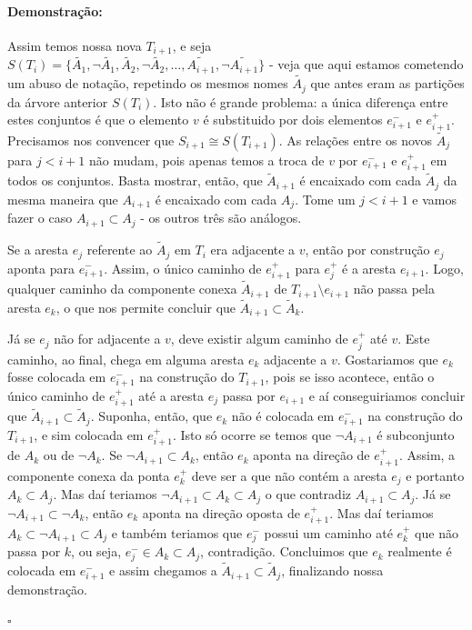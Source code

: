 \documentclass[11pt]{article}
\newcommand{\pulinho}{\vspace{.5cm}}
\theoremstyle{definition}
\theoremstyle{definition}
\theoremstyle{definition}
\theoremstyle{definition}
\theoremstyle{definition}
\theoremstyle{definition}
\theoremstyle{definition}
\theoremstyle{definition}
\theoremstyle{definition}
\theoremstyle{definition}
\theoremstyle{definition}
\theoremstyle{definition}
\newenvironment{prova}{\paragraph{Demonstração:}}{\hfill$\square$ 
\pulinho
}
\theoremstyle{definition}
\begin{document}
\begin{prova}
Assim temos nossa nova $T_{i+1}$, e seja $S(T_i) = \{\tilde{A_1},\lnot \tilde{A_1}, \tilde{A_2}, \lnot \tilde{A_2}, \dots, \widetilde{A_{i+1}}, \lnot \widetilde{A_{i+1}}\}$ - veja que aqui estamos cometendo um abuso de notação, repetindo os mesmos nomes $\tilde{A_j}$ que antes eram as partições da árvore anterior $S(T_i)$. Isto não é grande problema: a única diferença entre estes conjuntos é que o elemento $v$ é substituido por dois elementos $e_{i+1}^-$ e $e_{i+1}^+$. Precisamos nos convencer que $S_{i+1} \cong S(T_{i+1})$. As relações entre os novos $\tilde{A}_j$ para $j < i+1$ não mudam, pois apenas temos a troca de $v$ por $e_{i+1}^-$ e $e_{i+1}^+$ em todos os conjuntos. Basta mostrar, então, que $\widetilde{A}_{i+1}$ é encaixado com cada $\tilde{A}_j$ da mesma maneira que $A_{i+1}$ é encaixado com cada $A_j$. Tome um $j < i + 1$ e vamos fazer o caso $A_{i+1} \subset A_j$ - os outros três são análogos.

Se a aresta $e_j$ referente ao $\tilde{A}_j$ em $T_i$ era adjacente a $v$, então por construção $e_j$ aponta para $e_{i+1}^-$. Assim, o único caminho de $e_{i+1}^+$ para $e_j^+$ é a aresta $e_{i+1}$. Logo, qualquer caminho da componente conexa $\tilde{A}_{i+1}$ de $T_{i+1} \setminus e_{i+1}$ não passa pela aresta $e_k$, o que nos permite concluir que $\tilde{A}_{i+1} \subset \tilde{A}_k$.

Já se $e_j$ não for adjacente a $v$, deve existir algum caminho de $e_j^+$ até $v$. Este caminho, ao final, chega em alguma aresta $e_k$ adjacente a $v$. Gostariamos que $e_k$ fosse colocada em $e_{i+1}^-$ na construção do $T_{i+1}$, pois se isso acontece, então o único caminho de $e_{i+1}^+$ até a aresta $e_j$ passa por $e_{i+1}$ e aí conseguiriamos concluir que $\widetilde{A}_{i+1} \subset \tilde{A}_j$. Suponha, então, que $e_k$ não é colocada em $e_{i+1}^-$ na construção do $T_{i+1}$, e sim colocada em $e_{i+1}^+$. Isto só ocorre se temos que $\lnot A_{i+1}$ é subconjunto de $A_k$ ou de $\lnot A_k$. Se $\lnot A_{i+1} \subset A_k$, então $e_k$ aponta na direção de $e_{i+1}^+$. Assim, a componente conexa da ponta $e_k^+$ deve ser a que não contém a aresta $e_j$ e portanto $A_k \subset A_j$.  Mas daí teriamos $\lnot A_{i+1} \subset A_k \subset A_j$ o que contradiz $A_{i+1} \subset A_j$. Já se $\lnot A_{i+1} \subset \lnot A_k$, então $e_k$ aponta na direção oposta de $e_{i+1}^+$. Mas daí teriamos $A_k \subset \lnot A_{i+1} \subset A_j$ e também teriamos que $e_j^-$ possui um caminho até $e_k^+$ que não passa por $k$, ou seja, $e_j^- \in A_k \subset A_j$, contradição. Concluimos que $e_k$ realmente é colocada em $e_{i+1}^-$ e assim chegamos a $\widetilde{A}_{i+1} \subset \tilde{A}_j$, finalizando nossa demonstração.


\end{prova}
\end{document}
